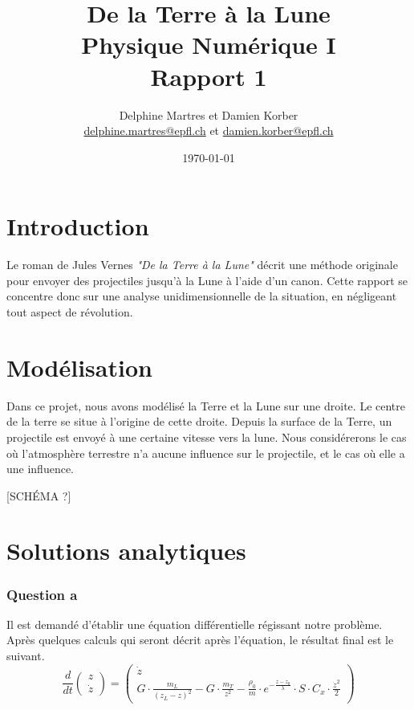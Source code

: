 \documentclass[a4paper,12pt,twoside]{article}
\newcommand{\mail}[1]{{\href{mailto:#1}{#1}}}
\begin{document}
\title{De la Terre à la Lune\\{\small Physique Numérique I}\\{\small Rapport 1}}
\date{\today}
\author{Delphine Martres et Damien Korber\\{\small \mail{delphine.martres@epfl.ch} et \mail{damien.korber@epfl.ch}}}
\maketitle
\tableofcontents %

\baselineskip=16pt
\parindent=15pt
\parskip=5pt




\section{Introduction}
Le roman de Jules Vernes \textit{"De la Terre à la Lune"} décrit une méthode originale pour envoyer des projectiles jusqu'à la Lune à l'aide d'un canon.
Cette rapport se concentre donc sur une analyse unidimensionnelle de la situation, en négligeant tout aspect de révolution.

\section{Modélisation}
Dans ce projet, nous avons modélisé la Terre et la Lune sur une droite.
Le centre de la terre se situe à l'origine de cette droite.
Depuis la surface de la Terre, un projectile est envoyé à une certaine vitesse vers la lune.
Nous considérerons le cas où l'atmosphère terrestre n'a aucune influence sur le projectile, et le cas où elle a une influence.

[SCHÉMA ?]

\section{Solutions analytiques}
\subsubsection*{Question a}
Il est demandé d'établir une équation différentielle régissant notre problème.
Après quelques calculs qui seront décrit après l'équation, le résultat final est le suivant.
\begin{equation}
    \frac{d}{dt}
    \begin{pmatrix}
        z \\
        \dot{z}
    \end{pmatrix}
    =
    \begin{pmatrix}
    \dot{z} \\
    G\cdot\frac{m_L}{(z_L - z)^2} - G\cdot\frac{m_T}{z^2} - \frac{\rho_0}{m}\cdot e^{-\frac{z-z_0}{\lambda}}\cdot S\cdot C_x\cdot \frac{\dot{z}^2}{2}
    \end{pmatrix}
    \label{eq:sol}
\end{equation}
\end{document}
